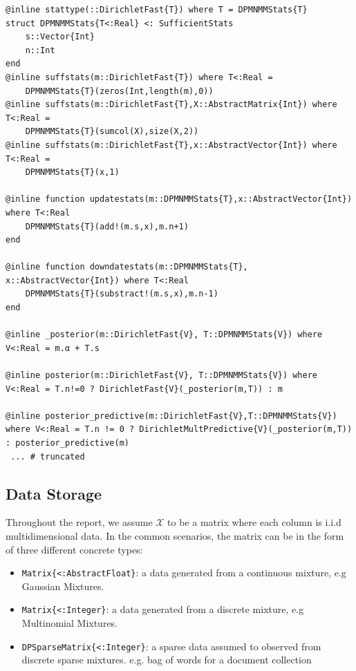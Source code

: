 \documentclass[12pt, a4paper]{article}
\newenvironment{code}{\captionsetup{type=listing}}{}
\begin{document}
\begin{code}
\label{code:dpmnmmstats}
\begin{verbatim}
@inline stattype(::DirichletFast{T}) where T = DPMNMMStats{T}
struct DPMNMMStats{T<:Real} <: SufficientStats
    s::Vector{Int}
    n::Int
end
@inline suffstats(m::DirichletFast{T}) where T<:Real =
    DPMNMMStats{T}(zeros(Int,length(m),0))
@inline suffstats(m::DirichletFast{T},X::AbstractMatrix{Int}) where T<:Real =
    DPMNMMStats{T}(sumcol(X),size(X,2))
@inline suffstats(m::DirichletFast{T},x::AbstractVector{Int}) where T<:Real =
    DPMNMMStats{T}(x,1)

@inline function updatestats(m::DPMNMMStats{T},x::AbstractVector{Int}) where T<:Real
    DPMNMMStats{T}(add!(m.s,x),m.n+1)
end

@inline function downdatestats(m::DPMNMMStats{T}, x::AbstractVector{Int}) where T<:Real
    DPMNMMStats{T}(substract!(m.s,x),m.n-1)
end

@inline _posterior(m::DirichletFast{V}, T::DPMNMMStats{V}) where V<:Real = m.α + T.s

@inline posterior(m::DirichletFast{V}, T::DPMNMMStats{V}) where V<:Real = T.n!=0 ? DirichletFast{V}(_posterior(m,T)) : m
    
@inline posterior_predictive(m::DirichletFast{V},T::DPMNMMStats{V}) where V<:Real = T.n != 0 ? DirichletMultPredictive{V}(_posterior(m,T)) : posterior_predictive(m)
 ... # truncated
\end{verbatim}
\end{code}

\subsection{Data Storage}

Throughout the report, we assume $\mathcal{X}$ to be a matrix where each column is i.i.d multidimensional data. In the common scenarios, the matrix can be in the form of three different concrete types:
\begin{itemize}
    \item \texttt{Matrix\{<:AbstractFloat\}}: a data generated from a continuous mixture, e.g Gaussian Mixtures.
    \item \texttt{Matrix\{<:Integer\}}: a data generated from a discrete mixture, e.g Multinomial Mixtures.
    \item \texttt{DPSparseMatrix\{<:Integer\}}: a sparse data assumed to observed from discrete sparse mixtures. e.g. bag of words for a document collection
\end{itemize}
\end{document}
